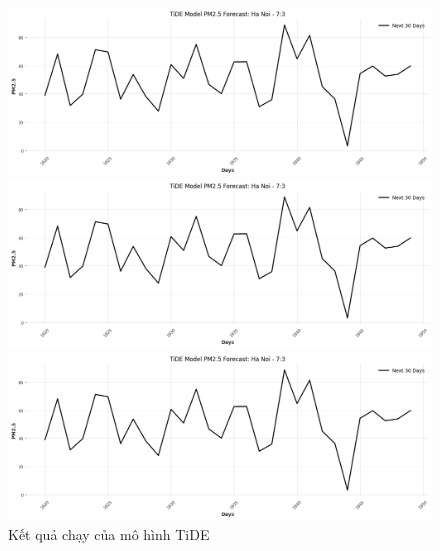 \begin{figure}[H]
    \begin{minipage}{0.15\textwidth}
    \centering
    \includegraphics[width=1\textwidth]{img/final/TiDE/TiDE_7_3_HN_30D.png}
    \end{minipage}
    \hfill
    \begin{minipage}{0.15\textwidth}
    \centering
    \includegraphics[width=1\textwidth]{img/final/TiDE/TiDE_7_3_HN_30D.png}
    \end{minipage}
    \hfill
    \begin{minipage}{0.15\textwidth}
    \centering
    \includegraphics[width=1\textwidth]{img/final/TiDE/TiDE_7_3_HN_30D.png}
    \end{minipage}
    \hfill
    
    \caption{Kết quả chạy của mô hình TiDE}
    \label{fig:TiDE}
\end{figure}
